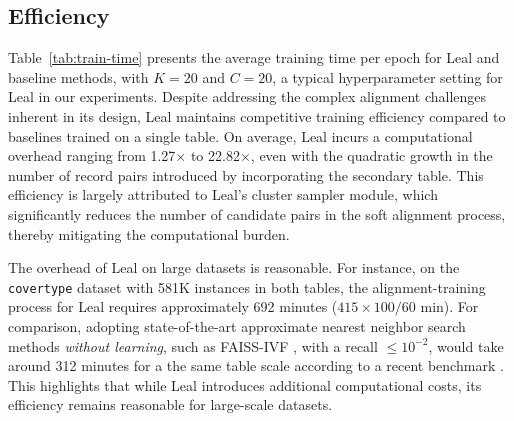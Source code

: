 \subsection{Efficiency}\label{subsec:efficiency}

Table~\ref{tab:train-time} presents the average training time per epoch for Leal and baseline methods, with $K=20$ and $C=20$, a typical hyperparameter setting for Leal in our experiments. Despite addressing the complex alignment challenges inherent in its design, Leal maintains competitive training efficiency compared to baselines trained on a single table. On average, Leal incurs a computational overhead ranging from 1.27\(\times\) to 22.82\(\times\), even with the quadratic growth in the number of record pairs introduced by incorporating the secondary table. This efficiency is largely attributed to Leal’s cluster sampler module, which significantly reduces the number of candidate pairs in the soft alignment process, thereby mitigating the computational burden. 

The overhead of Leal on large datasets is reasonable. For instance, on the \texttt{covertype} dataset with 581K instances in both tables, the alignment-training process for Leal requires approximately 692 minutes ($415 \times 100 / 60$ min). For comparison, adopting state-of-the-art approximate nearest neighbor search methods \textit{without learning}, such as FAISS-IVF \cite{douze2024faiss}, with a recall $\leq 10^{-2}$, would take around 312 minutes for a the same table scale according to a recent benchmark \cite{aumuller2020ann}. This highlights that while Leal introduces additional computational costs, its efficiency remains reasonable for large-scale datasets.




